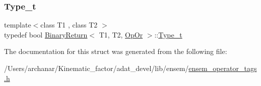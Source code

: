 \subsubsection{\texorpdfstring{Type\_t}{Type\_t}\hspace{0.1cm}{\footnotesize\ttfamily [2/2]}}
{\footnotesize\ttfamily template$<$class T1 , class T2 $>$ \\
typedef bool \mbox{\hyperlink{structBinaryReturn}{Binary\+Return}}$<$ T1, T2, \mbox{\hyperlink{structOpOr}{Op\+Or}} $>$\+::\mbox{\hyperlink{structBinaryReturn_3_01T1_00_01T2_00_01OpOr_01_4_a1680bdb61ac9ebe2b2be3fb7de1329b4}{Type\+\_\+t}}}



The documentation for this struct was generated from the following file\+:\begin{DoxyCompactItemize}
\item 
/\+Users/archanar/\+Kinematic\+\_\+factor/adat\+\_\+devel/lib/ensem/\mbox{\hyperlink{lib_2ensem_2ensem__operator__tags_8h}{ensem\+\_\+operator\+\_\+tags.\+h}}\end{DoxyCompactItemize}
